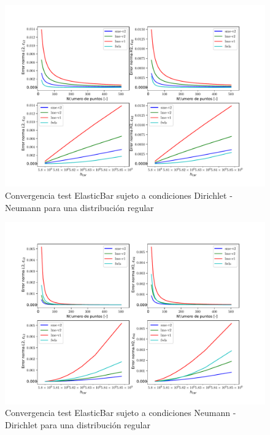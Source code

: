 \begin{figure}
    \centering
    \includegraphics[width=1\textwidth]{./Imagenes/06/comparacion_shp_regular/ElasticBar_regular_type-2_caso-2_direct_dgesv-lapack-blas_sme-v2_lme-v2_lme-v1_fwls.pdf}
    \caption{Convergencia test ElasticBar sujeto a condiciones Dirichlet - Neumann para una distribución regular} \label{fig:ElasticBar_caso-2_conv}
\end{figure}
\begin{figure}
    \centering
    \includegraphics[width=1\textwidth]{./Imagenes/06/comparacion_shp_regular/ElasticBar_regular_type-2_caso-3_direct_dgesv-lapack-blas_sme-v2_lme-v2_lme-v1_fwls.pdf}
    \caption{Convergencia test ElasticBar sujeto a condiciones Neumann - Dirichlet para una distribución regular} \label{fig:ElasticBar_caso-3_conv}
\end{figure}

